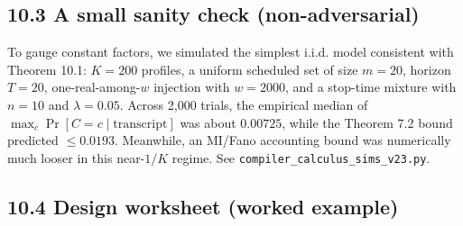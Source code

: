 \documentclass[11pt]{article}
\begin{document}
\hypertarget{a-small-sanity-check-non-adversarial}{%
\subsection{10.3 A small sanity check
(non-adversarial)}\label{a-small-sanity-check-non-adversarial}}

To gauge constant factors, we simulated the simplest i.i.d. model
consistent with Theorem 10.1: \(K=200\) profiles, a uniform scheduled
set of size \(m=20\), horizon \(T=20\), one-real-among-\(w\) injection
with \(w=2000\), and a stop-time mixture with \(n=10\) and
\(\lambda=0.05\). Across 2,000 trials, the empirical median of
\(\max_c \Pr[C=c\mid \text{transcript}]\) was about \(0.00725\), while
the Theorem 7.2 bound predicted \(\le 0.0193\). Meanwhile, an MI/Fano
accounting bound was numerically much looser in this near-\(1/K\)
regime. See \texttt{compiler\_calculus\_sims\_v23.py}.

\hypertarget{design-worksheet-worked-example}{%
\subsection{10.4 Design worksheet (worked
example)}\label{design-worksheet-worked-example}}
\end{document}
